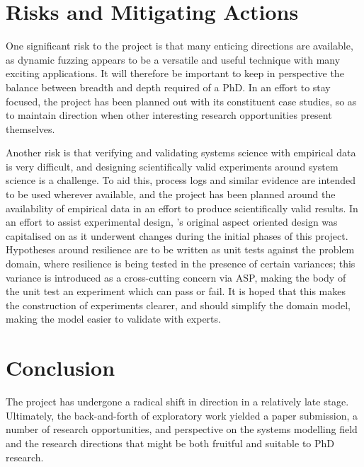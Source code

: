 \documentclass[draft]{article}
\begin{document}
\section{Risks and Mitigating Actions}
\label{sec:research_risks}


One significant risk to the project is that many enticing directions are
available, as dynamic fuzzing appears to be a versatile and useful technique
with many exciting applications. It will therefore be important to keep in
perspective the balance between breadth and depth required of a PhD. In an
effort to stay focused, the project has been planned out with its constituent
case studies, so as to maintain direction when other interesting research
opportunities present themselves.\par

Another risk is that verifying and validating systems science with empirical
data is very difficult, and designing scientifically valid experiments around
system science is a challenge. To aid this, process logs and similar evidence
are intended to be used wherever available, and the project has been planned
around the availability of empirical data in an effort to produce scientifically
valid results. In an effort to assist experimental design, \pdsf{}'s original
aspect oriented design was capitalised on as it underwent changes during the
initial phases of this project. Hypotheses around resilience are to be written
as unit tests against the problem domain, where resilience is being tested in
the presence of certain variances; this variance is introduced as a
cross-cutting concern via ASP, making the body of the unit test an experiment
which can pass or fail. It is hoped that this makes the construction of
experiments clearer, and should simplify the domain model\cite{caise_forum_18},
making the model easier to validate with experts.\par



\section{Conclusion}
\label{sec:concluion}

The project has undergone a radical shift in direction in a relatively late
stage. Ultimately, the back-and-forth of exploratory work yielded a paper
submission\cite{realx_paper}, a number of research opportunities, and perspective on
the systems modelling field and the research directions that might be both
fruitful and suitable to PhD research.\par
\end{document}
